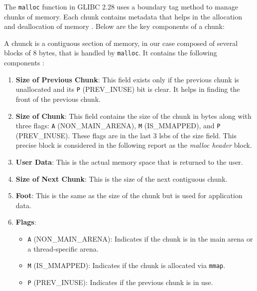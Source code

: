     The \texttt{malloc} function in GLIBC 2.28 uses a boundary tag method to manage chunks of memory. Each chunk contains metadata that helps in the allocation and deallocation of memory \cite{MallocGLIBC2001} \cite{MallocInternalsWiki2023}. Below are the key components of a chunk:

    A chunck is a contiguous section of memory, in our case composed of several blocks of 8 bytes, that is handled by \texttt{malloc}. It contains the following components \cite{MallocInternalsWiki2023} \cite{StackExchangeMalloc2023}:

    \begin{enumerate}
        \item \textbf{Size of Previous Chunk}: This field exists only if the previous chunk is unallocated and its \texttt{P} (PREV\_INUSE) bit is clear. It helps in finding the front of the previous chunk.
        
        \item \textbf{Size of Chunk}: This field contains the size of the chunk in bytes along with three flags: \texttt{A} (NON\_MAIN\_ARENA), \texttt{M} (IS\_MMAPPED), and \texttt{P} (PREV\_INUSE). These flags are in the last 3 \acrshort{lsb}s of the size field. This precise block is considered in the following report as the \textit{malloc header} block.
        
        \item \textbf{User Data}: This is the actual memory space that is returned to the user.
        
        \item \textbf{Size of Next Chunk}: This is the size of the next contiguous chunk.
        
        \item \textbf{Foot}: This is the same as the size of the chunk but is used for application data.
        
        \item \textbf{Flags}:
        \begin{itemize}
            \item \texttt{A} (NON\_MAIN\_ARENA): Indicates if the chunk is in the main arena or a thread-specific arena.
            \item \texttt{M} (IS\_MMAPPED): Indicates if the chunk is allocated via \texttt{mmap}.
            \item \texttt{P} (PREV\_INUSE): Indicates if the previous chunk is in use.
        \end{itemize}
    \end{enumerate}

